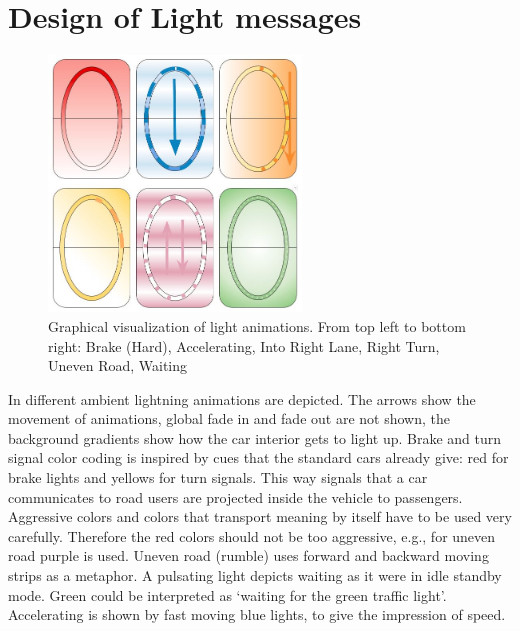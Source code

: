 \section{Design of Light messages}
\begin{figure}
    \includegraphics[width=0.6\textwidth]{fig/lightsignals.JPG}
    \caption[Light animations]{Graphical visualization of light animations. From top left to bottom right:
Brake (Hard), Accelerating, Into Right Lane, Right Turn, Uneven Road, Waiting}
    \label{fig:lightanimations}
\end{figure}
In  different ambient lightning animations are depicted. The arrows show the movement of animations, global fade in and fade out are not shown, the background gradients show how the car interior gets to light up. Brake and turn signal color coding is inspired by cues that the standard cars already give: red for brake lights and yellows for turn signals. This way signals that a car communicates to road users are projected inside the vehicle to passengers. Aggressive colors and colors that transport meaning by itself have to be used very carefully. Therefore the red colors should not be too aggressive, e.g., for uneven road purple is used. Uneven road (rumble) uses forward and backward moving strips as a metaphor. A pulsating light depicts waiting as it were in idle standby mode. Green could be interpreted as ‘waiting for the green traffic light’. Accelerating is shown by fast moving blue lights, to give the impression of speed.